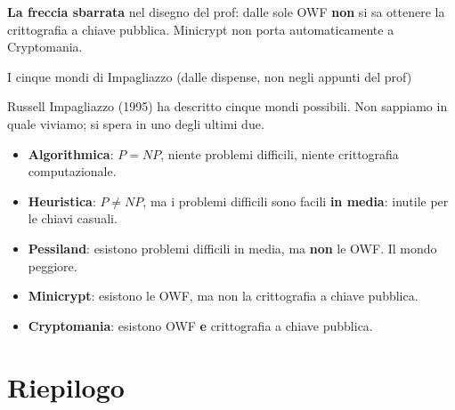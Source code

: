 \textbf{La freccia sbarrata} nel disegno del prof: dalle sole OWF \textbf{non} si sa ottenere la crittografia a chiave pubblica. Minicrypt non porta automaticamente a Cryptomania.

\begin{approfondimento}{I cinque mondi di Impagliazzo (dalle dispense, non negli appunti del
prof)}

Russell Impagliazzo (1995) ha descritto cinque mondi possibili. Non sappiamo in quale viviamo; si spera in uno degli ultimi due.

\begin{itemize}
\tightlist
\item
  \textbf{Algorithmica}: \(P = NP\), niente problemi difficili, niente crittografia computazionale.
\item
  \textbf{Heuristica}: \(P \neq NP\), ma i problemi difficili sono facili \textbf{in media}: inutile per le chiavi casuali.
\item
  \textbf{Pessiland}: esistono problemi difficili in media, ma \textbf{non} le OWF. Il mondo peggiore.
\item
  \textbf{Minicrypt}: esistono le OWF, ma non la crittografia a chiave pubblica.
\item
  \textbf{Cryptomania}: esistono OWF \textbf{e} crittografia a chiave pubblica.
\end{itemize}

\end{approfondimento}

\section{Riepilogo}

